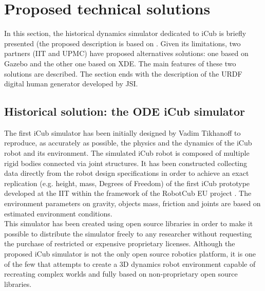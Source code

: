 \documentclass[12pt,a4paper,twoside]{article}
\begin{document}
\section{Proposed technical solutions}
\label{sec:solutions}

In this section, the historical dynamics simulator dedicated to iCub is briefly presented (the proposed description is based on \cite{tikhanoff2008open}. Given its limitations, two partners (IIT and UPMC) have proposed alternatives solutions: one based on Gazebo and the other one based on XDE. The main features of these two solutions are described. The section ends with the description of the URDF digital human generator developed by JSI. 

\subsection{Historical solution: the ODE iCub simulator}

The first iCub simulator has been initially designed by Vadim Tikhanoff to reproduce, as accurately as possible, the physics and the dynamics of the iCub robot and its environment. The simulated iCub robot is composed of multiple rigid bodies connected via joint structures. It has been constructed collecting data directly from the robot design specifications in order to achieve an exact replication (e.g. height, mass, Degrees of Freedom) of the first iCub prototype developed at the IIT within the framework of the RobotCub EU project  \cite{Robotcub}. The environment parameters on gravity, objects mass, friction and joints are based on estimated environment conditions.\\

This simulator has been created using open source libraries in order to make it possible to distribute the simulator freely to any researcher without requesting the purchase of restricted or expensive proprietary licenses. Although the proposed iCub simulator is not the only open source robotics platform, it is one of the few that attempts to create a 3D dynamics robot environment capable of recreating complex worlds and fully based on non-proprietary open source libraries.\\
\end{document}
